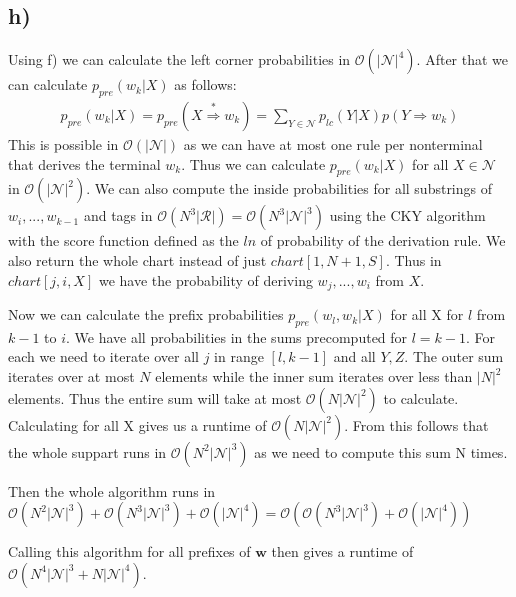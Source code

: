 \documentclass[a4paper,12pt]{ETHexercise}
\begin{document}
\subsection*{h)}
Using f) we can calculate the left corner probabilities in $\mathcal{O}(|\mathcal{N}|^4)$. After that we can calculate $p_{pre}(w_k|X)$ as follows:
\begin{align}
    p_{pre}(w_k|X) = p_{pre}(X \stackrel{*}{\Rightarrow} w_k) = \sum_{Y \in \mathcal{N}}p_{lc}(Y|X)p(Y \Rightarrow w_k)
\end{align}
This is possible in $\mathcal{O}(|\mathcal{N}|)$ as we can have at most one rule per nonterminal that derives the terminal $w_k$. Thus we can calculate $p_{pre}(w_k|X)$ for all $X \in \mathcal{N}$ in $\mathcal{O}(|\mathcal{N}|^2)$. 
We can also compute the inside probabilities for all substrings of $w_i,...,w_{k-1}$ and tags in $\mathcal{O}(N^3|\mathcal{R}|) = \mathcal{O}(N^3|\mathcal{N}|^3)$ using the CKY algorithm with the score function defined as the $ln$ of probability of the derivation rule. We also return the whole chart instead of just $chart[1,N+1,S]$. Thus in $chart[j,i,X]$ we have the probability of deriving $w_j,...,w_i$ from $X$. 

Now we can calculate the prefix probabilities $p_{pre}(w_l, w_k | X)$ for all X for $l$ from $k-1$ to $i$. We have all probabilities in the sums precomputed for $l = k-1$. For each we need to iterate over all $j$ in range $[l,k-1]$ and all $Y,Z$. The outer sum iterates over at most $N$ elements while the inner sum iterates over less than $|N|^2$ elements. Thus the entire sum will take at most $\mathcal{O}(N|\mathcal{N}|^2)$ to calculate. Calculating for all X gives us a runtime of $\mathcal{O}(N|\mathcal{N}|^2)$. From this follows that the whole suppart runs in $\mathcal{O}(N^2|\mathcal{N}|^3)$ as we need to compute this sum N times.

Then the whole algorithm runs in $\mathcal{O}(N^2|\mathcal{N}|^3) + \mathcal{O}(N^3|\mathcal{N}|^3) + \mathcal{O}(|\mathcal{N}|^4) = \mathcal{O}(\mathcal{O}(N^3|\mathcal{N}|^3) + \mathcal{O}(|\mathcal{N}|^4))$

Calling this algorithm for all prefixes of $\textbf{w}$ then gives a runtime of $\mathcal{O}(N^4|\mathcal{N}|^3 + N|\mathcal{N}|^4)$.
\end{document}
